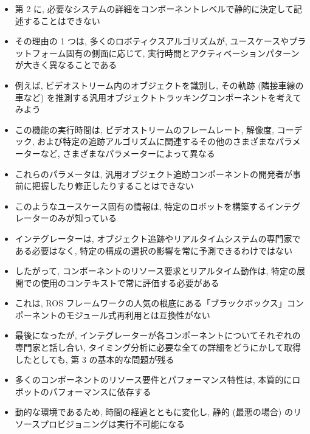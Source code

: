 \begin{frame}{}
    \begin{itemize}
        \item 第 2 に, 必要なシステムの詳細をコンポーネントレベルで静的に決定して記述することはできない
        \item その理由の 1 つは, 多くのロボティクスアルゴリズムが, ユースケースやプラットフォーム固有の側面に応じて, 実行時間とアクティベーションパターンが大きく異なることである
        \item 例えば, ビデオストリーム内のオブジェクトを識別し, その軌跡 (隣接車線の車など) を推測する汎用オブジェクトトラッキングコンポーネントを考えてみよう
        \item この機能の実行時間は, ビデオストリームのフレームレート, 解像度, コーデック, および特定の追跡アルゴリズムに関連するその他のさまざまなパラメーターなど, さまざまなパラメーターによって異なる
    \end{itemize}
\end{frame}

\begin{frame}{}
    \begin{itemize}
        \item これらのパラメータは, 汎用オブジェクト追跡コンポーネントの開発者が事前に把握したり修正したりすることはできない
        \item このようなユースケース固有の情報は, 特定のロボットを構築するインテグレーターのみが知っている
        \item インテグレーターは, オブジェクト追跡やリアルタイムシステムの専門家である必要はなく, 特定の構成の選択の影響を常に予測できるわけではない
        \item したがって, コンポーネントのリソース要求とリアルタイム動作は, 特定の展開での使用のコンテキストで常に評価する必要がある
        \item これは, ROS フレームワークの人気の根底にある「ブラックボックス」コンポーネントのモジュール式再利用とは互換性がない
    \end{itemize}
\end{frame}

\begin{frame}{}
    \begin{itemize}
        \item 最後になったが, インテグレーターが各コンポーネントについてそれぞれの専門家と話し合い, タイミング分析に必要な全ての詳細をどうにかして取得したとしても, 第 3 の基本的な問題が残る
        \item 多くのコンポーネントのリソース要件とパフォーマンス特性は, 本質的にロボットのパフォーマンスに依存する
        \item 動的な環境であるため, 時間の経過とともに変化し, 静的 (最悪の場合) のリソースプロビジョニングは実行不可能になる
    \end{itemize}
\end{frame}

